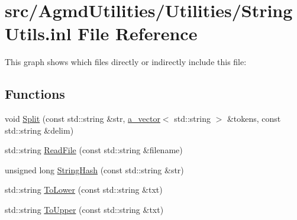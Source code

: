 \hypertarget{_string_utils_8inl}{\section{src/\+Agmd\+Utilities/\+Utilities/\+String\+Utils.inl File Reference}
\label{_string_utils_8inl}
}
This graph shows which files directly or indirectly include this file\+:
\subsection*{Functions}
\begin{DoxyCompactItemize}
\item 
void \hyperlink{_string_utils_8inl_af27301de54d6c5f94150be98960fb19b}{Split} (const std\+::string \&str, \hyperlink{_vector_8h_a3df82cea60ff4ad0acb44e58454406a5}{a\+\_\+vector}$<$ std\+::string $>$ \&tokens, const std\+::string \&delim)
\item 
std\+::string \hyperlink{_string_utils_8inl_a49e72d1f8eb4859f7ec8c45b15cce1c8}{Read\+File} (const std\+::string \&filename)
\item 
unsigned long \hyperlink{_string_utils_8inl_ab202cf4240041e664d48851f446680e4}{String\+Hash} (const std\+::string \&str)
\item 
std\+::string \hyperlink{_string_utils_8inl_a40652f9e667c7ecd6ce070e838105e0f}{To\+Lower} (const std\+::string \&txt)
\item 
std\+::string \hyperlink{_string_utils_8inl_ac2cf815ac75553477df390e8dba42032}{To\+Upper} (const std\+::string \&txt)
\end{DoxyCompactItemize}


